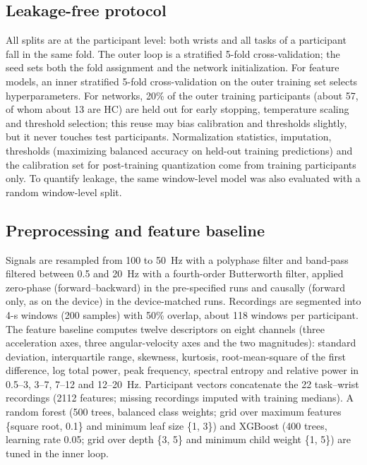 \documentclass[preprint,12pt]{elsarticle}
\begin{document}
\subsection{Leakage-free protocol}
All splits are at the participant level: both wrists and all tasks of a participant fall in the same fold. The outer loop is a stratified 5-fold cross-validation; the seed sets both the fold assignment and the network initialization. For feature models, an inner stratified 5-fold cross-validation on the outer training set selects hyperparameters. For networks, 20\% of the outer training participants (about 57, of whom about 13 are HC) are held out for early stopping, temperature scaling and threshold selection; this reuse may bias calibration and thresholds slightly, but it never touches test participants. Normalization statistics, imputation, thresholds (maximizing balanced accuracy on held-out training predictions) and the calibration set for post-training quantization come from training participants only. To quantify leakage, the same window-level model was also evaluated with a random window-level split.

\subsection{Preprocessing and feature baseline}
Signals are resampled from 100 to 50~Hz with a polyphase filter and band-pass filtered between 0.5 and 20~Hz with a fourth-order Butterworth filter, applied zero-phase (forward--backward) in the pre-specified runs and causally (forward only, as on the device) in the device-matched runs. Recordings are segmented into 4-s windows (200 samples) with 50\% overlap, about 118 windows per participant. The feature baseline computes twelve descriptors on eight channels (three acceleration axes, three angular-velocity axes and the two magnitudes): standard deviation, interquartile range, skewness, kurtosis, root-mean-square of the first difference, log total power, peak frequency, spectral entropy and relative power in 0.5--3, 3--7, 7--12 and 12--20~Hz. Participant vectors concatenate the 22 task--wrist recordings (2112 features; missing recordings imputed with training medians). A random forest (500 trees, balanced class weights; grid over maximum features \{square root, 0.1\} and minimum leaf size \{1, 3\}) and XGBoost (400 trees, learning rate 0.05; grid over depth \{3, 5\} and minimum child weight \{1, 5\}) are tuned in the inner loop.
\end{document}
